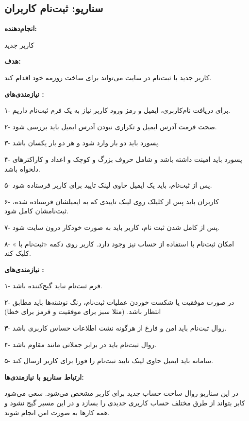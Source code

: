 \documentclass[]{article}
\begin{document}
	\subsection{\LARGE{سناریو: ثبت‌نام کاربران}}
	
	
	
	\textbf{انجام‌دهنده:}
	
	کاربر جدید
	
	\textbf{هدف:}
	
	کاربر جدید با ثبت‌نام در سایت می‌تواند برای ساخت روزمه خود اقدام کند.
	
	\textbf{نیازمندی‌های :} 
	
	۱- برای دریافت نام‌کاربری، ایمیل و رمز ورود کاربر نیاز به یک فرم ثبت‌نام داریم.
	
	۲- صحت فرمت آدرس ایمیل و تکراری نبودن آدرس ایمیل باید بررسی شود.
	
	۳- پسورد باید دو بار وارد شود و هر دو بار یکسان باشد.
	
	۴- پسورد باید امینت داشته باشد و شامل حروف بزرگ و کوچک و اعداد و کاراکترهای دلخواه باشد.
	
	۵- پس از ثبت‌نام، باید یک ایمیل حاوی لینک تایید برای کاربر فرستاده شود.
	
	۶- کاربران باید پس از کلیلک روی لینک تاییدی که به ایمیلشان فرستاده شده، ثبت‌‌نامشان کامل شود.
	
	۷- پس از کامل شدن ثبت نام، کاربر باید به صورت خودکار درون سایت  شود.
	
	۸- امکان ثبت‌نام با استفاده از حساب  نیز وجود دارد. کاربر روی دکمه «ثبت‌نام با » کلیک کند.
	
	\textbf{نیازمندی‌های :}
	
	۱- فرم ثبت‌نام نباید گیج‌کننده باشد.
	
	۲- در صورت موفقیت یا شکست خوردن عملیات ثبت‌نام، رنگ نوشته‌ها باید مطابق انتظار باشد. (مثلا سبز برای موفقیت و قرمز برای خطا)
	
	۳- روال ثبت‌نام باید امن و فارغ از هرگونه نشت اطلاعات حساس کاربری باشد.
	
	۴- روال ثبت‌نام باید در برابر جملاتی مانند  مقاوم باشد.
	
	۵- سامانه باید ایمیل حاوی لینک تایید ثبت‌نام را فورا برای کاربر ارسال کند.
	
	\textbf{ارتباط سناریو با نیازمندی‌ها:}
	
	در  این سناریو روال ساخت حساب جدید برای کاربر مشخص می‌شود. سعی می‌شود کابر بتواند از طرق مختلف حساب کاربری جدیدی را بسازد و در این مسیر گیج نشود و همه کارها به صورت امن انجام شوند.
	
\end{document}
